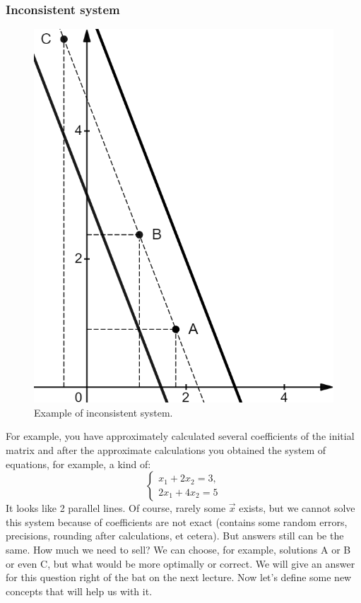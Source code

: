     \subsubsection*{Inconsistent system}
    \begin{figure}
        \includegraphics[height=0.3\columnwidth, width=0.24\columnwidth]{lectures/images/inconsistent_system_without_vectors.png}
        \caption*{\scriptsize{Example of inconsistent system.}}
        \label{fig:inconsistent}
    \end{figure}
    For example, you have approximately calculated several coefficients of the initial matrix and after the approximate calculations you obtained the system of equations, for example, a kind of: 
    \[
        \left\{ \begin{array}{c}
        x_1 + 2x_2 = 3,\\
        2x_1 + 4x_2 = 5
           \end{array}
        \right. 
    \]
    It looks like 2 parallel lines. Of course, rarely some $\vec{x}$ exists, but we cannot solve this system because of coefficients are not exact (contains some random errors, precisions, rounding after calculations, et cetera). But answers still can be the same. How much we need to sell? We can choose, for example, solutions A or B or even C, but what would be more optimally or correct. We will give an answer for this question right of the bat on the next lecture. Now let's define some new concepts that will help us with it.
